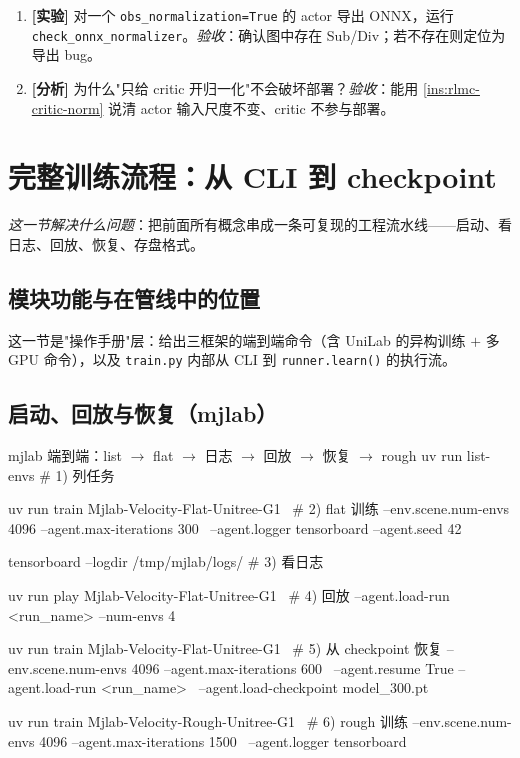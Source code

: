 \begin{practice}[归一化归属判断]
\begin{enumerate}
  \item \textbf{[实验]} 对一个 \verb|obs_normalization=True| 的 actor 导出 ONNX，运行 \verb|check_onnx_normalizer|。\emph{验收}：确认图中存在 Sub/Div；若不存在则定位为导出 bug。
  \item \textbf{[分析]} 为什么"只给 critic 开归一化"不会破坏部署？\emph{验收}：能用 \cref{ins:rlmc-critic-norm} 说清 actor 输入尺度不变、critic 不参与部署。
\end{enumerate}
\end{practice}

\section{完整训练流程：从 CLI 到 checkpoint}
\label{sec:rlmc-train-flow}

\emph{这一节解决什么问题}：把前面所有概念串成一条可复现的工程流水线——启动、看日志、回放、恢复、存盘格式。

\subsection{模块功能与在管线中的位置}

这一节是"操作手册"层：给出三框架的端到端命令（含 UniLab 的异构训练 $+$ 多 GPU 命令），以及 \verb|train.py| 内部从 CLI 到 \verb|runner.learn()| 的执行流。

\subsection{启动、回放与恢复（mjlab）}

\begin{codebox}[bash]{mjlab 端到端：list $\to$ flat $\to$ 日志 $\to$ 回放 $\to$ 恢复 $\to$ rough}
uv run list-envs                                   # 1) 列任务

uv run train Mjlab-Velocity-Flat-Unitree-G1 \      # 2) flat 训练
  --env.scene.num-envs 4096 --agent.max-iterations 300 \
  --agent.logger tensorboard --agent.seed 42

tensorboard --logdir /tmp/mjlab/logs/              # 3) 看日志

uv run play Mjlab-Velocity-Flat-Unitree-G1 \       # 4) 回放
  --agent.load-run <run_name> --num-envs 4

uv run train Mjlab-Velocity-Flat-Unitree-G1 \      # 5) 从 checkpoint 恢复
  --env.scene.num-envs 4096 --agent.max-iterations 600 \
  --agent.resume True --agent.load-run <run_name> \
  --agent.load-checkpoint model_300.pt

uv run train Mjlab-Velocity-Rough-Unitree-G1 \     # 6) rough 训练
  --env.scene.num-envs 4096 --agent.max-iterations 1500 \
  --agent.logger tensorboard
\end{codebox}

